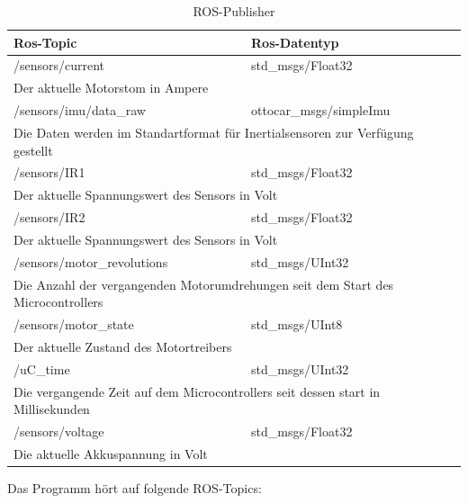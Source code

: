 \begin{table}[H]
  \centering
  \begin{tabularx}{\textwidth}{|l|l|}
    \hline
     Ros-Topic 			& Ros-Datentyp			 \\ \hline \hline	
    /sensors/current		& std\_msgs/Float32														\\ \hline
    \multicolumn{2}{|X|}{Der aktuelle Motorstom in Ampere}											\\ \hline\hline
    /sensors/imu/data\_raw	& ottocar\_msgs/simpleImu													\\ \hline
    \multicolumn{2}{|X|}{Die Daten werden im Standartformat für Inertialsensoren zur Verfügung gestellt	}						\\ \hline\hline
    /sensors/IR1		& std\_msgs/Float32										\\ \hline
     \multicolumn{2}{|X|}{Der aktuelle Spannungswert des Sensors in Volt}										\\ \hline\hline
    /sensors/IR2		& std\_msgs/Float32										\\ \hline
      \multicolumn{2}{|X|}{Der aktuelle Spannungswert des Sensors in Volt}										\\ \hline\hline
    /sensors/motor\_revolutions	& std\_msgs/UInt32										\\ \hline
      \multicolumn{2}{|X|}{Die Anzahl der vergangenden Motorumdrehungen seit dem Start des Microcontrollers}						\\ \hline\hline
    /sensors/motor\_state	& std\_msgs/UInt8										\\ \hline
      \multicolumn{2}{|X|}{Der aktuelle Zustand des Motortreibers}											\\ \hline\hline
    /uC\_time			& std\_msgs/UInt32										\\ \hline
      \multicolumn{2}{|X|}{Die vergangende Zeit auf dem Microcontrollers seit dessen start in Millisekunden}						\\ \hline\hline
    /sensors/voltage		& std\_msgs/Float32										\\ \hline
     \multicolumn{2}{|X|}{Die aktuelle Akkuspannung in Volt}												\\ \hline

  \end{tabularx}
  \caption{ROS-Publisher}%
  \label{tab:ros-pub}
\end{table}


Das Programm hört auf folgende ROS-Topics:\\

